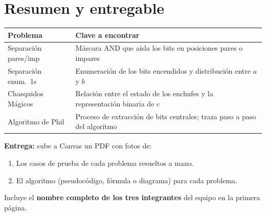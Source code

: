 \documentclass[12pt, oneside]{article}
\begin{document}
\section{Resumen y entregable}

\begin{center}
\begin{tabular}{lp{7cm}}
  \toprule
  \textbf{Problema} & \textbf{Clave a encontrar} \\
  \midrule
  Separación pares/imp & Máscara AND que aísla los bits en posiciones pares
                         o impares \\[4pt]
  Separación enum.\ 1s & Enumeración de los bits encendidos y distribución
                         entre $a$ y $b$ \\[4pt]
  Chasquidos Mágicos   & Relación entre el estado de los enchufes y la
                         representación binaria de $c$ \\[4pt]
  Algoritmo de Phil    & Proceso de extracción de bits centrales; traza
                         paso a paso del algoritmo \\
  \bottomrule
\end{tabular}
\end{center}

\vspace{0.5cm}

\begin{advertencia}
  \textbf{Entrega:} sube a Canvas un PDF con fotos de:
  \begin{enumerate}
    \item Los casos de prueba de cada problema resueltos a mano.
    \item El algoritmo (pseudocódigo, fórmula o diagrama) para cada problema.
  \end{enumerate}
  Incluye el \textbf{nombre completo de los tres integrantes} del equipo en
  la primera página.
\end{advertencia}
\end{document}
